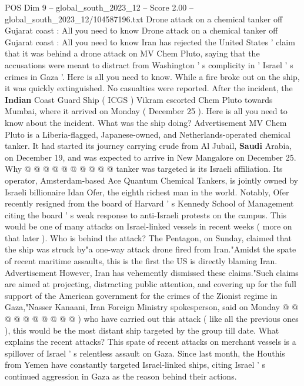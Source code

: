 \begin{textsample}{POS Dim 9 – global\_south\_2023\_12 – Score 2.00 – global\_south\_2023\_12/104587196.txt}  \label{ex:f9_pos_144}
Drone attack on a chemical tanker off Gujarat coast : All you need to know Drone attack on a chemical tanker off Gujarat coast : All you need to know Iran has rejected the United States ' claim that it was behind a drone attack on MV Chem Pluto, saying that the accusations were meant to distract from Washington ' s complicity in ' Israel ' s crimes in Gaza '.
Here is all you need to know.
While a fire broke out on the ship, it was quickly extinguished.
No casualties were reported.
After the incident, the \textbf{Indian} Coast Guard Ship ( ICGS ) Vikram escorted Chem Pluto towards Mumbai, where it arrived on Monday ( December 25 ).
Here is all you need to know about the incident.
What was the ship doing?
Advertisement MV Chem Pluto is a Liberia-flagged, Japanese-owned, and Netherlands-operated chemical tanker.
It had started its journey carrying crude from Al Jubail, \textbf{Saudi} Arabia, on December 19, and was expected to arrive in New Mangalore on December 25.
Why @ @ @ @ @ @ @ @ @ @ tanker was targeted is its Israeli affiliation.
Its operator, Amsterdam-based Ace Quantum Chemical Tankers, is jointly owned by Israeli billionaire Idan Ofer, the eighth richest man in the world.
Notably, Ofer recently resigned from the board of Harvard ' s Kennedy School of Management citing the board ' s weak response to anti-Israeli protests on the campus.
This would be one of many attacks on Israel-linked vessels in recent weeks ( more on that later ).
Who is behind the attack?
The Pentagon, on Sunday, claimed that the ship was struck by"a one-way attack drone fired from Iran."Amidst the spate of recent maritime assaults, this is the first the US is directly blaming Iran.
Advertisement However, Iran has vehemently dismissed these claims."Such claims are aimed at projecting, distracting public attention, and covering up for the full support of the American government for the crimes of the Zionist regime in Gaza,"Nasser Kanaani, Iran Foreign Ministry spokesperson, said on Monday @ @ @ @ @ @ @ @ @ @ ) who have carried out this attack ( like all the previous ones ), this would be the most distant ship targeted by the group till date.
What explains the recent attacks?
This spate of recent attacks on merchant vessels is a spillover of Israel ' s relentless assault on Gaza.
Since last month, the Houthis from Yemen have constantly targeted Israel-linked ships, citing Israel ' s continued aggression in Gaza as the reason behind their actions.

\end{textsample}
